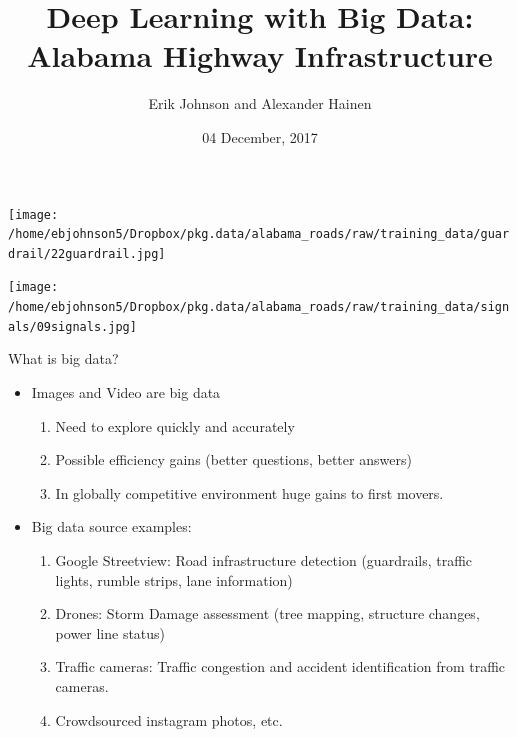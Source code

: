 \documentclass[ignorenonframetext,]{beamer}
\title{Deep Learning with Big Data: \newline Alabama Highway Infrastructure}
\author{Erik Johnson and Alexander Hainen}
\date{04 December, 2017}
\providecommand{\tightlist}{%
  \setlength{\itemsep}{0pt}\setlength{\parskip}{0pt}}
\begin{document}
\frame{\titlepage}

\begin{frame}{}

\texttt{[image: /home/ebjohnson5/Dropbox/pkg.data/alabama\_roads/raw/training\_data/guardrail/22guardrail.jpg]}

\end{frame}

\begin{frame}{}

\texttt{[image: /home/ebjohnson5/Dropbox/pkg.data/alabama\_roads/raw/training\_data/signals/09signals.jpg]}

\end{frame}

\begin{frame}{What is big data?}

\begin{itemize}
\tightlist
\item
  Images and Video are big data

  \begin{enumerate}
  \def\labelenumi{\arabic{enumi}.}
  \tightlist
  \item
    Need to explore quickly and accurately
  \item
    Possible efficiency gains (better questions, better answers)
  \item
    In globally competitive environment huge gains to first movers.
  \end{enumerate}
\item
  Big data source examples:

  \begin{enumerate}
  \def\labelenumi{\arabic{enumi}.}
  \tightlist
  \item
    Google Streetview: Road infrastructure detection (guardrails,
    traffic lights, rumble strips, lane information)
  \item
    Drones: Storm Damage assessment (tree mapping, structure changes,
    power line status)
  \item
    Traffic cameras: Traffic congestion and accident identification from
    traffic cameras.
  \item
    Crowdsourced instagram photos, etc.
  \end{enumerate}
\end{itemize}

\end{frame}
\end{document}
